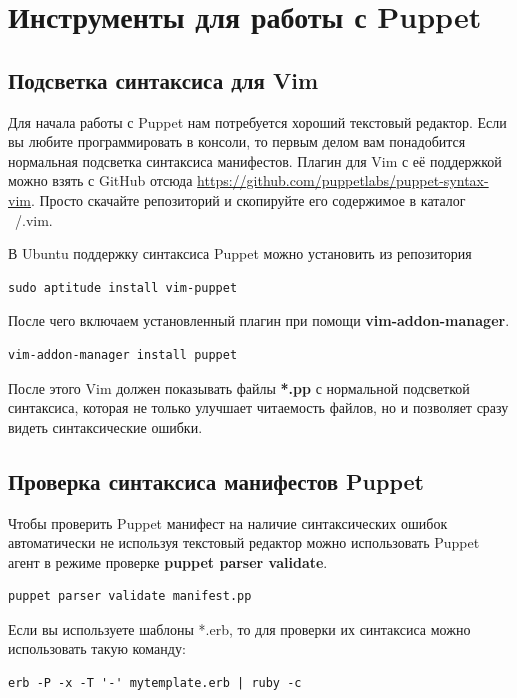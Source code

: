 \chapter{Инструменты для работы с Puppet}

\section{Подсветка синтаксиса для Vim}

Для начала работы с Puppet нам потребуется хороший текстовый редактор. Если вы любите программировать в консоли, то первым делом вам понадобится нормальная подсветка синтаксиса манифестов. Плагин для Vim с её поддержкой можно взять с GitHub отсюда \url{https://github.com/puppetlabs/puppet-syntax-vim}. Просто скачайте репозиторий и скопируйте его содержимое в каталог ~/.vim.

В Ubuntu поддержку синтаксиса Puppet можно установить из репозитория

\begin{verbatim}
sudo aptitude install vim-puppet
\end{verbatim}

После чего включаем установленный плагин при помощи \textbf{vim-addon-manager}.

\begin{verbatim}
vim-addon-manager install puppet
\end{verbatim}

После этого Vim должен показывать файлы \textbf{*.pp} с нормальной подсветкой синтаксиса, которая не только улучшает читаемость файлов, но и позволяет сразу видеть синтаксические ошибки.

\section{Проверка синтаксиса манифестов Puppet}

Чтобы проверить Puppet манифест на наличие синтаксических ошибок автоматически не используя текстовый редактор можно использовать Puppet агент в режиме проверке \textbf{puppet parser validate}.

\begin{verbatim}
puppet parser validate manifest.pp
\end{verbatim}

Если вы используете шаблоны *.erb, то для проверки их синтаксиса можно использовать такую команду:

\begin{verbatim}
erb -P -x -T '-' mytemplate.erb | ruby -c
\end{verbatim}

